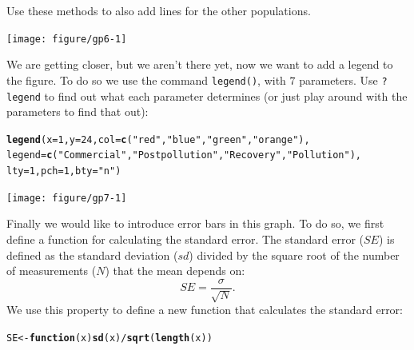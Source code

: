 \documentclass{article}\usepackage[]{graphicx}\usepackage[]{color}
\makeatletter
\newcommand{\hlnum}[1]{\textcolor[rgb]{0.686,0.059,0.569}{#1}}%
\newcommand{\hlstr}[1]{\textcolor[rgb]{0.192,0.494,0.8}{#1}}%
\newcommand{\hlopt}[1]{\textcolor[rgb]{0,0,0}{#1}}%
\newcommand{\hlstd}[1]{\textcolor[rgb]{0.345,0.345,0.345}{#1}}%
\newcommand{\hlkwa}[1]{\textcolor[rgb]{0.161,0.373,0.58}{\textbf{#1}}}%
\newcommand{\hlkwb}[1]{\textcolor[rgb]{0.69,0.353,0.396}{#1}}%
\newcommand{\hlkwc}[1]{\textcolor[rgb]{0.333,0.667,0.333}{#1}}%
\newcommand{\hlkwd}[1]{\textcolor[rgb]{0.737,0.353,0.396}{\textbf{#1}}}%
\newenvironment{kframe}{%
 \def\at@end@of@kframe{}%
 \ifinner\ifhmode%
  \def\at@end@of@kframe{\end{minipage}}%
  \begin{minipage}{\columnwidth}%
 \fi\fi%
 \def\FrameCommand##1{\hskip\@totalleftmargin \hskip-\fboxsep
 \colorbox{shadecolor}{##1}\hskip-\fboxsep
     \hskip-\linewidth \hskip-\@totalleftmargin \hskip\columnwidth}%
 \MakeFramed {\advance\hsize-\width
   \@totalleftmargin\z@ \linewidth\hsize
   \@setminipage}}%
 {\par\unskip\endMakeFramed%
 \at@end@of@kframe}
\newenvironment{knitrout}{}{} %
\makeatother
\begin{document}
Use these methods to also add lines for the other populations.\\
\begin{knitrout}
\color{fgcolor}

{\centering \texttt{[image: figure/gp6-1]} 

}



\end{knitrout}
We are getting closer, but we aren't there yet, now we want to add a legend to the figure. To do so we use the command \texttt{legend()}, with $7$ parameters. Use \texttt{?legend} to find out what each parameter determines (or just play around with the parameters to find that out):
\begin{knitrout}
\color{fgcolor}\begin{kframe}
\begin{alltt}
\hlkwd{legend}\hlstd{(}\hlkwc{x}\hlstd{=}\hlnum{1}\hlstd{,} \hlkwc{y}\hlstd{=}\hlnum{24}\hlstd{,} \hlkwc{col}\hlstd{=}\hlkwd{c}\hlstd{(}\hlstr{"red"}\hlstd{,}\hlstr{"blue"}\hlstd{,}\hlstr{"green"}\hlstd{,}\hlstr{"orange"}\hlstd{),}
\hlkwc{legend}\hlstd{=}\hlkwd{c}\hlstd{(}\hlstr{"Commercial"}\hlstd{,}\hlstr{"Postpollution"}\hlstd{,}\hlstr{"Recovery"}\hlstd{,}\hlstr{"Pollution"}\hlstd{),}
\hlkwc{lty}\hlstd{=}\hlnum{1}\hlstd{,} \hlkwc{pch}\hlstd{=}\hlnum{1}\hlstd{,} \hlkwc{bty}\hlstd{=}\hlstr{"n"}\hlstd{)}
\end{alltt}
\end{kframe}

{\centering \texttt{[image: figure/gp7-1]} 

}



\end{knitrout}
Finally we would like to introduce error bars in this graph. To do so, we first define a function for calculating the standard error. The standard error ($SE$) is defined as the standard deviation ($sd$) divided by the square root of the number of measurements ($N$) that the mean depends on:
\begin{equation*}
SE = \frac{\sigma}{\sqrt{N}}.
\end{equation*}
We use this property to define a new function that calculates the standard error:
\begin{knitrout}
\color{fgcolor}\begin{kframe}
\begin{alltt}
\hlstd{SE}\hlkwb{<-}\hlkwa{function}\hlstd{(}\hlkwc{x}\hlstd{)} \hlkwd{sd}\hlstd{(x)}\hlopt{/}\hlkwd{sqrt}\hlstd{(}\hlkwd{length}\hlstd{(x))}
\end{alltt}
\end{kframe}
\end{knitrout}
\end{document}
